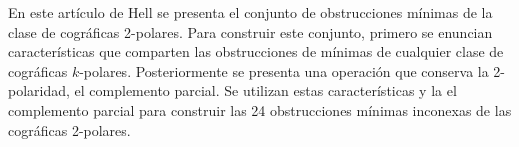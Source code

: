 En este artículo de Hell \cite{Hell03} se presenta el conjunto de obstrucciones mínimas de la clase de cográficas 2-polares. Para construir este conjunto, primero se enuncian características que comparten las obstrucciones de mínimas de cualquier clase de cográficas $k$-polares. Posteriormente se presenta una operación que conserva la 2-polaridad, el complemento parcial. Se utilizan estas características y la el complemento parcial para construir las 24 obstrucciones mínimas inconexas de las cográficas 2-polares.